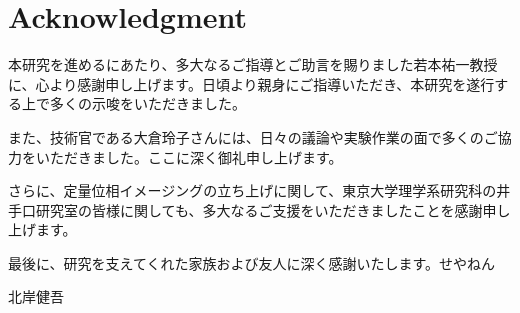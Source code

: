 \chapter*{Acknowledgment}
本研究を進めるにあたり、多大なるご指導とご助言を賜りました若本祐一教授に、心より感謝申し上げます。日頃より親身にご指導いただき、本研究を遂行する上で多くの示唆をいただきました。

また、技術官である大倉玲子さんには、日々の議論や実験作業の面で多くのご協力をいただきました。ここに深く御礼申し上げます。

さらに、定量位相イメージングの立ち上げに関して、東京大学理学系研究科の井手口研究室の皆様に関しても、多大なるご支援をいただきましたことを感謝申し上げます。

最後に、研究を支えてくれた家族および友人に深く感謝いたします。せやねん
\begin{flushright}
	 北岸健吾
\end{flushright}
